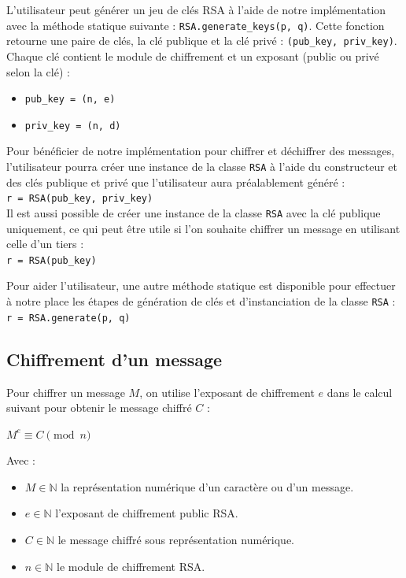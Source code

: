 \documentclass[a4paper, 12pt]{article}
\begin{document}
L'utilisateur peut générer un jeu de clés RSA à l'aide de notre implémentation avec la méthode statique suivante : \texttt{RSA.generate\_keys(p, q)}. Cette fonction retourne une paire de clés, la clé publique et la clé privé : \texttt{(pub\_key, priv\_key)}. Chaque clé contient le module de chiffrement et un exposant (public ou privé selon la clé) :
\begin{itemize}[label=\textbullet]
    \item \texttt{pub\_key = (n, e)}
    \item \texttt{priv\_key = (n, d)}
\end{itemize}
\bigskip

Pour bénéficier de notre implémentation pour chiffrer et déchiffrer des messages, l'utilisateur pourra créer une instance de la classe \texttt{RSA} à l'aide du constructeur et des clés publique et privé que l'utilisateur aura préalablement généré : \\
\texttt{r = RSA(pub\_key, priv\_key)} \\
Il est aussi possible de créer une instance de la classe \texttt{RSA} avec la clé publique uniquement, ce qui peut être utile si l'on souhaite chiffrer un message en utilisant celle d'un tiers : \\
\texttt{r = RSA(pub\_key)}

Pour aider l'utilisateur, une autre méthode statique est disponible pour effectuer à notre place les étapes de génération de clés et d'instanciation de la classe \texttt{RSA} : \\
\texttt{r = RSA.generate(p, q)}

\newpage
\subsection{Chiffrement d'un message}

Pour chiffrer un message $M$, on utilise l'exposant de chiffrement $e$ dans le calcul suivant pour obtenir le message chiffré $C$ :
\begin{center}
    \large $M^e \equiv C \pmod n$ 
\end{center}

Avec :
\begin{itemize}[label=\textbullet]
    \item { \large $M \in \mathbb{N}$ } la représentation numérique d'un caractère ou d'un message.
    \item { \large $e \in \mathbb{N}$ } l'exposant de chiffrement public RSA.
    \item { \large $C \in \mathbb{N}$ } le message chiffré sous représentation numérique.
    \item { \large $n \in \mathbb{N}$ } le module de chiffrement RSA.
\end{itemize}
\bigskip
\end{document}
